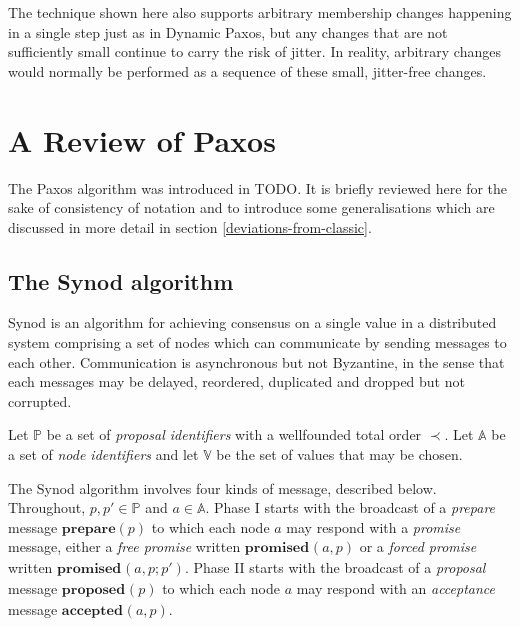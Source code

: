 \documentclass[journal]{IEEEtran}
\begin{document}
The technique shown here also supports arbitrary membership changes happening
in a single step just as in Dynamic Paxos, but any changes that are not
sufficiently small continue to carry the risk of jitter. In reality, arbitrary
changes would normally be performed as a sequence of these small, jitter-free
changes.

\section{A Review of Paxos}

The Paxos algorithm was introduced in TODO. It is briefly reviewed here for the
sake of consistency of notation and to introduce some generalisations which are
discussed in more detail in section \ref{deviations-from-classic}.

\subsection{The Synod algorithm}

Synod is an algorithm for achieving consensus on a single value in a
distributed system comprising a set of nodes which can communicate by sending
messages to each other. Communication is asynchronous but not Byzantine, in the
sense that each messages may be delayed, reordered, duplicated and dropped but
not corrupted.

Let $\mathbb P$ be a set of \textit{proposal identifiers} with a wellfounded
total order $\prec$. Let $\mathbb A$ be a set of \textit{node identifiers} and
let $\mathbb V$ be the set of values that may be chosen.

\def\prep#1{\mathbf{prepare}(#1)}
\def\mprom#1#2#3{\mathbf{promised}_{\ge #1}(#2,#3)}
\def\fprom#1#2#3{\mathbf{promised}_{#1}(#2,#3)}
\def\bprom#1#2#3#4{\mathbf{promised}_{#1}(#2,#3;#4)}
\def\prop#1#2{\mathbf{proposed}_{#1}(#2)}
\def\acc#1#2#3{\mathbf{accepted}_{#1}(#2,#3)}
\def\chosen#1#2{\mathbf{chosen}_{#1}(#2)}
\def\owner#1{\mathrm{owner}(#1)}

The Synod algorithm involves four kinds of message, described below.
Throughout, $p, p' \in \mathbb P$ and $a \in \mathbb A$.  Phase I starts with
the broadcast of a \textit{prepare} message $\prep{p}$ to which each node $a$
may respond with a \textit{promise} message, either a \textit{free promise}
written $\fprom{}{a}{p}$ or a \textit{forced promise} written
$\bprom{}{a}{p}{p'}$.  Phase II starts with the broadcast of a
\textit{proposal} message $\prop{}{p}$ to which each node $a$ may respond with
an \textit{acceptance} message $\acc{}{a}{p}$.
\end{document}
